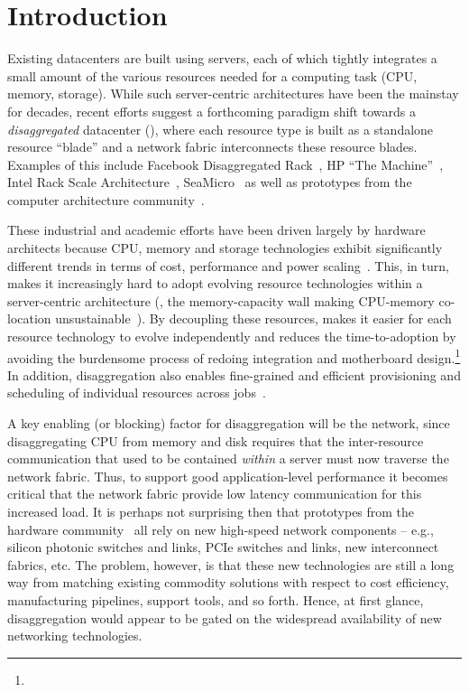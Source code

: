 
\section{Introduction}
\label{sec:intro}
Existing datacenters are built using servers, each of which tightly integrates a small amount of the various resources needed for a computing task (CPU, memory, storage). While such server-centric architectures have been the mainstay for decades, recent efforts suggest a forthcoming paradigm shift towards a {\em disaggregated} datacenter (\dis), where each resource type is built as a standalone resource ``blade'' and a network fabric interconnects these resource blades. Examples of this include Facebook Disaggregated Rack~\cite{fdr}, HP ``The Machine''~\cite{hptm}, Intel Rack Scale Architecture~\cite{rsa}, SeaMicro~\cite{seamicro} as well as prototypes from the computer architecture community~\cite{firebox, sonuma, ddcHwDesign1}. 

These industrial and academic efforts have been driven largely by hardware architects because CPU, memory and storage technologies exhibit significantly different trends in terms of cost, performance and power scaling~\cite{memristors,nvram,reg-ex-hardware,gpus}. This, in turn, makes it increasingly hard to adopt evolving resource technologies within a server-centric architecture (\eg, the memory-capacity wall making CPU-memory co-location unsustainable~\cite{memwall}). 
By decoupling these resources, \dis makes it easier for each resource technology to evolve independently and reduces the time-to-adoption by avoiding the burdensome process of redoing integration and motherboard design.\footnote{}
In addition, disaggregation also enables fine-grained and efficient provisioning and scheduling of individual resources across jobs~\cite{hotnets}. 


A key enabling (or blocking) factor for disaggregation will be the network, since disaggregating CPU from memory and disk requires that the inter-resource communication that used to be contained \emph{within} a server must now traverse the network fabric. 
Thus, to support good application-level performance it becomes critical that the network fabric provide low latency communication for this increased load. 
It is perhaps not surprising then that prototypes from the hardware community~\cite{rsa, fdr, hptm, seamicro, firebox, sonuma, ddcHwDesign1} all rely on new high-speed network components -- e.g., silicon photonic switches and links, PCIe switches and links, new interconnect fabrics, etc.
The problem, however, is that these new technologies are still a long way from matching existing commodity solutions with respect to cost efficiency,  manufacturing pipelines, support tools, and so forth. Hence, at first glance, disaggregation would appear to be gated on the widespread availability of new networking technologies. 

